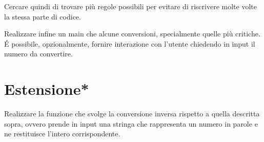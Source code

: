 \documentclass[addpoints,12pt,answers]{exam}
\begin{document}
Cercare quindi di trovare più regole possibili per evitare di
riscrivere molte volte la stessa parte di codice.

Realizzare infine un main che alcune conversioni, specialmente quelle più critiche.
\'E possibile, opzionalmente, fornire interazione con l'utente chiedendo in input
il numero da convertire.

\section{Estensione*}

Realizzare la funzione che svolge la conversione inversa rispetto a quella descritta sopra,
ovvero prende in input una stringa che rappresenta un numero in parole e ne restituisce
l'intero corrispondente.
\end{document}
